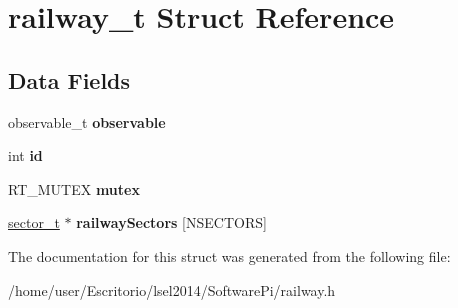 \hypertarget{structrailway__t}{\section{railway\-\_\-t \-Struct \-Reference}
\label{structrailway__t}
}
\subsection*{\-Data \-Fields}
\begin{DoxyCompactItemize}
\item 
\hypertarget{structrailway__t_a4fe8feaf0f90748f284bfe253bad9119}{observable\-\_\-t {\bfseries observable}}\label{structrailway__t_a4fe8feaf0f90748f284bfe253bad9119}

\item 
\hypertarget{structrailway__t_ab257d01b6bb5c0d7d12c57d365fb1ace}{int {\bfseries id}}\label{structrailway__t_ab257d01b6bb5c0d7d12c57d365fb1ace}

\item 
\hypertarget{structrailway__t_a3edcff0680f4422fdf12f7381dac9a8f}{\-R\-T\-\_\-\-M\-U\-T\-E\-X {\bfseries mutex}}\label{structrailway__t_a3edcff0680f4422fdf12f7381dac9a8f}

\item 
\hypertarget{structrailway__t_a5efb6366d79446893918f6b3e0f9cc78}{\hyperlink{structsector__t}{sector\-\_\-t} $\ast$ {\bfseries railway\-Sectors} \mbox{[}\-N\-S\-E\-C\-T\-O\-R\-S\mbox{]}}\label{structrailway__t_a5efb6366d79446893918f6b3e0f9cc78}

\end{DoxyCompactItemize}


\-The documentation for this struct was generated from the following file\-:\begin{DoxyCompactItemize}
\item 
/home/user/\-Escritorio/lsel2014/\-Software\-Pi/railway.\-h\end{DoxyCompactItemize}
